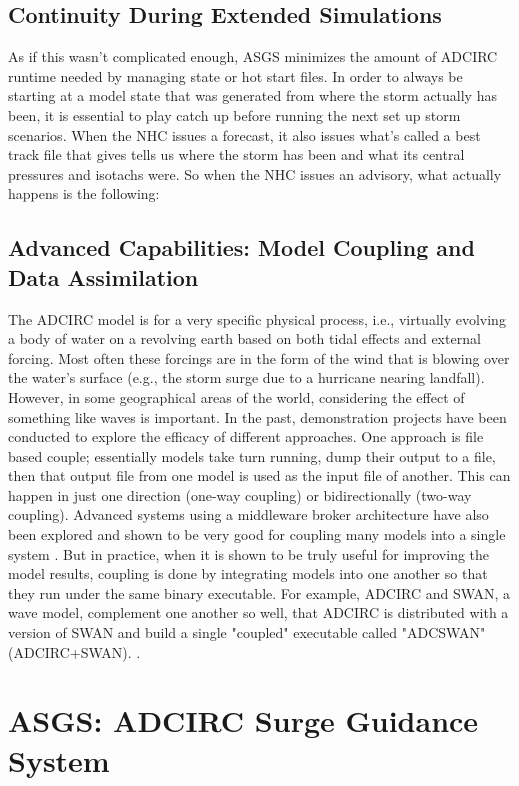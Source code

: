 \documentclass{article}
\begin{document}
\subsection{Continuity During Extended Simulations}

As if this wasn’t complicated enough, ASGS minimizes the amount of ADCIRC
runtime needed by managing state or hot start files. In order to always be
starting at a model state that was generated from where the storm actually has
been, it is essential to play catch up before running the next set up storm
scenarios.  When the NHC issues a forecast, it also issues what’s called a best
track file that gives tells us where the storm has been and what its central
pressures and isotachs were. So when the NHC issues an advisory, what actually
happens is the following:

\subsection{Advanced Capabilities: Model Coupling and Data Assimilation}

The ADCIRC model is for a very specific physical process, i.e., virtually
evolving a body of water on a revolving earth based on both tidal effects and
external forcing. Most often these forcings are in the form of the wind that is
blowing over the water's surface (e.g., the storm surge due to a hurricane
nearing landfall). However, in some geographical areas of the world, considering
the effect of something like waves is important.  In the past, demonstration
projects have been conducted to explore the efficacy of different approaches.
One approach is file based couple; essentially models take turn running, dump
their output to a file, then that output file from one model is used as the
input file of another. This can happen in just one direction (one-way coupling)
or bidirectionally (two-way coupling). Advanced systems using a middleware
broker architecture have also been explored and shown to be very good for
coupling many models into a single system \cite{}.  But in practice, when
it is shown to be truly useful for improving the model results, coupling is done
by integrating models into one another so that they run under the same binary
executable. For example, ADCIRC and SWAN, a wave model, complement one another
so well, that ADCIRC is distributed with a version of SWAN and build a single
"coupled" executable called "ADCSWAN" (ADCIRC+SWAN). \cite{}.

\section{ASGS: ADCIRC Surge Guidance System}
\end{document}

